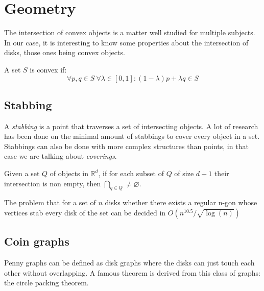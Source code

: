 \section{Geometry}
\label{sec:geom}

The intersection of convex objects is a matter well studied for multiple
subjects. In our case, it is interesting to know some properties about
the intersection of disks, those ones being convex objects.

A set $S$ is convex if:
$$\forall p,q \in S\  \forall \lambda \in [0,1]: (1-\lambda)p + \lambda q \in S$$

\subsection{Stabbing}
A \textit{stabbing} is a point that traverses a set of intersecting objects. A lot of
research has been done \cite{schlipf2013stabbing} on the minimal amount of stabbings to
cover every object in a set. Stabbings can also be done with more complex structures
than points, in that case we are talking about \textit{coverings}.

\begin{theorem}[Helly]
  Given a set $Q$ of objects in $\mathbb{R}^d$, if for each subset of $Q$ of
  size $d+1$ their intersection is non empty, then $\bigcap_{q \in Q} \neq
  \varnothing$. \cite{Helly1923175}
\end{theorem}

\begin{theorem}
  The problem that for a set of $n$ disks whether there exists a regular n-gon
  whose vertices stab every disk of the set can be decided in $O(n^{10.5} / \sqrt{\log(n)})$ \cite{schlipf2013stabbing}
\end{theorem}

\subsection{Coin graphs}

Penny graphs can be defined as disk graphs where the disks can just touch each
other without overlapping. A famous theorem is derived from this class of graphs:
the circle packing theorem.

